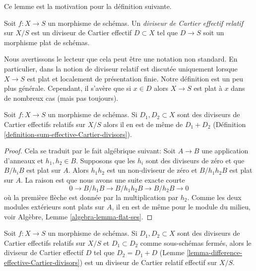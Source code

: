 \noindent
Ce lemme est la motivation pour la définition suivante.

\begin{definition}
\label{definition-relative-effective-Cartier-divisor}
Soit  $f : X \to S$  un morphisme de schémas. Un  {\it  diviseur de
Cartier effectif relatif}  sur  $X/S$  est un diviseur de Cartier
effectif  $D \subset X$  tel que  $D \to S$  soit un morphisme plat de schémas.
\end{definition}

\noindent
Nous avertissons le lecteur que cela peut être une notation non standard. En
particulier, dans  \cite[IV, Section 21.15]{EGA}  la notion de diviseur relatif est discutée
uniquement lorsque  $X \to S$  est plat et localement de présentation finie.
Notre définition est un peu plus générale. Cependant, il s'avère que si
 $x \in D$  alors  $X \to S$  est plat à  $x$  dans de nombreux cas (mais
pas toujours).

\begin{lemma}
\label{lemma-sum-relative-effective-Cartier-divisor}
Soit  $f : X \to S$  un morphisme de schémas. Si  $D_1, D_2 \subset X$  sont des diviseurs de
Cartier effectifs relatifs sur  $X/S$  alors il en est de même de
 $D_1 + D_2$  (Définition  \ref{definition-sum-effective-Cartier-divisors}).
\end{lemma}

\begin{proof}
Cela se traduit par le fait algébrique suivant: Soit  $A \to B$  une application
d'anneaux et  $h_1, h_2 \in B$. Supposons que les  $h_i$  sont des diviseurs de
zéro et que  $B/h_iB$  est plat sur  $A$. Alors  $h_1h_2$  est un
non-diviseur de zéro et  $B/h_1h_2B$  est plat sur  $A$. La raison est que
nous avons une suite exacte courte
$$
0 \to B/h_1B \to B/h_1h_2B \to B/h_2B \to 0
$$
où la première flèche est donnée par la multiplication par  $h_2$. Comme les
deux modules extérieurs sont plats sur  $A$, il en est de même pour le
module du milieu, voir Algèbre, Lemme  \ref{algebra-lemma-flat-ses}.
\end{proof}

\begin{lemma}
\label{lemma-difference-relative-effective-Cartier-divisor}
Soit  $f : X \to S$  un morphisme de schémas. Si  $D_1, D_2 \subset X$  sont des diviseurs de
Cartier effectifs relatifs sur  $X/S$  et  $D_1 \subset D_2$  comme sous-schémas
fermés, alors le diviseur de Cartier effectif  $D$  tel que  $D_2 = D_1 + D$ 
(Lemme  \ref{lemma-difference-effective-Cartier-divisors}) est un diviseur de Cartier relatif effectif sur  $X/S$.
\end{lemma}

